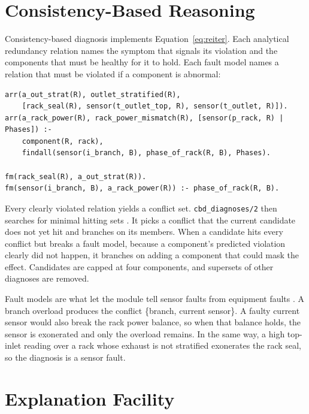 \section{Consistency-Based Reasoning}
\label{sec:cbd}

Consistency-based diagnosis implements Equation~\eqref{eq:reiter}. Each analytical redundancy relation names the symptom that signals its violation and the components that must be healthy for it to hold. Each fault model names a relation that must be violated if a component is abnormal:
\begin{lstlisting}
arr(a_out_strat(R), outlet_stratified(R),
    [rack_seal(R), sensor(t_outlet_top, R), sensor(t_outlet, R)]).
arr(a_rack_power(R), rack_power_mismatch(R), [sensor(p_rack, R) | Phases]) :-
    component(R, rack),
    findall(sensor(i_branch, B), phase_of_rack(R, B), Phases).

fm(rack_seal(R), a_out_strat(R)).
fm(sensor(i_branch, B), a_rack_power(R)) :- phase_of_rack(R, B).
\end{lstlisting}
Every clearly violated relation yields a conflict set. \texttt{cbd\_diagnoses/2} then searches for minimal hitting sets \parencite{reiter1987}. It picks a conflict that the current candidate does not yet hit and branches on its members. When a candidate hits every conflict but breaks a fault model, because a component's predicted violation clearly did not happen, it branches on adding a component that could mask the effect. Candidates are capped at four components, and supersets of other diagnoses are removed.

Fault models are what let the module tell sensor faults from equipment faults \parencite{struss1989}. A branch overload produces the conflict \{branch, current sensor\}. A faulty current sensor would also break the rack power balance, so when that balance holds, the sensor is exonerated and only the overload remains. In the same way, a high top-inlet reading over a rack whose exhaust is not stratified exonerates the rack seal, so the diagnosis is a sensor fault.

\section{Explanation Facility}
\label{sec:explanation}

